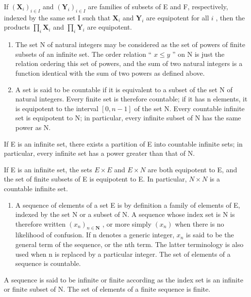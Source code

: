 If \((\mathbf{X}_i)_{i\in I}\) and \((\mathbf{Y}_i)_{i\in I}\) are families of subsets of E and F, respectively, indexed by the same set I such that \(\mathbf{X}_i\) and \(\mathbf{Y}_i\) are equipotent for all \(i\) , then the products \(\prod_{i}\mathbf{X}_{i}\) and \(\prod_{i}\mathbf{Y}_{i}\) are equipotent.

\begin{enumerate}
\def\labelenumi{\arabic{enumi}.}
\setcounter{enumi}{5}
\item
  The set N of natural integers may be considered as the set of powers of finite subsets of an infinite set. The order relation `` \(x \leqslant y\) '' on N is just the relation ordering this set of powers, and the sum of two natural integers is a function identical with the sum of two powers as defined above.
\item
  A set is said to be countable if it is equivalent to a subset of the set N of natural integers. Every finite set is therefore countable; if it has n elements, it is equipotent to the interval \([0, n - 1]\) of the set N. Every countable infinite set is equipotent to N; in particular, every infinite subset of N has the same power as N.
\end{enumerate}

If E is an infinite set, there exists a partition of E into countable infinite sets; in particular, every infinite set has a power greater than that of N.

If E is an infinite set, the sets \(E \times E\) and \(E \times N\) are both equipotent to E, and the set of finite subsets of E is equipotent to E. In particular, \(N \times N\) is a countable infinite set.

\begin{enumerate}
\def\labelenumi{\arabic{enumi}.}
\setcounter{enumi}{7}
\tightlist
\item
  A sequence of elements of a set E is by definition a family of elements of E, indexed by the set N or a subset of N. A sequence whose index set is N is therefore written \((x_{n})_{n\in\mathbf{N}}\) , or more simply \((x_{n})\) when there is no likelihood of confusion. If n denotes a generic integer, \(x_{n}\) is said to be the general term of the sequence, or the nth term. The latter terminology is also used when n is replaced by a particular integer. The set of elements of a sequence is countable.
\end{enumerate}

A sequence is said to be infinite or finite according as the index set is an infinite or finite subset of N. The set of elements of a finite sequence is finite.

